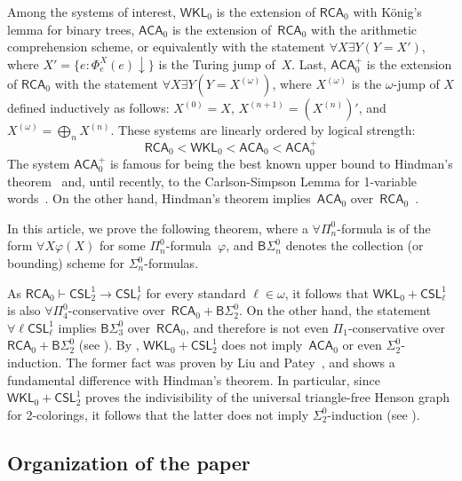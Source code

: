 \documentclass{article}
\numberwithin{theorem}{section}
\newtheorem{maintheorem}[theorem]{Main Theorem}
\newcommand{\RCA}{\mathsf{RCA}}
\newcommand{\WKL}{\mathsf{WKL}}
\newcommand{\ACA}{\mathsf{ACA}}
\newcommand{\CSL}{\mathsf{CSL}}
\newcommand{\BSig}{\mathsf{B}\Sigma^0}
\begin{document}
Among the systems of interest, $\WKL_0$ is the extension of $\RCA_0$ with K\"onig's lemma for binary trees, $\ACA_0$ is the extension of~$\RCA_0$ with the arithmetic comprehension scheme, or equivalently with the statement $\forall X \exists Y(Y = X')$, where $X' = \{ e : \Phi^X_e(e)\downarrow \}$ is the Turing jump of~$X$. Last, $\ACA_0^+$ is the extension of $\RCA_0$ with the statement $\forall X \exists Y(Y = X^{(\omega)})$, where $X^{(\omega)}$ is the $\omega$-jump of $X$ defined inductively as follows: $X^{(0)} = X$, $X^{(n+1)} = (X^{(n)})'$, and  $X^{(\omega)} = \bigoplus_n X^{(n)}$. These systems are linearly ordered by logical strength:
$$
\RCA_0 < \WKL_0 < \ACA_0 < \ACA_0^+
$$
The system $\ACA_0^+$ is famous for being the best known upper bound to Hindman's theorem~\cite{Towsner2012simple} and, until recently, to the Carlson-Simpson Lemma for 1-variable words~\cite{angles2023carlson}. On the other hand, Hindman's theorem implies~$\ACA_0$ over~$\RCA_0$~\cite{blass1987logical}.

In this article, we prove the following theorem, where a $\forall \Pi^0_n$-formula is of the form $\forall X \varphi(X)$ for some $\Pi^0_n$-formula~$\varphi$, and $\BSig_n$ denotes the collection (or bounding) scheme for $\Sigma^0_n$-formulas.


As $\RCA_0 \vdash \CSL^1_2 \to \CSL^1_\ell$ for every standard $\ell \in \omega$, it follows that $\WKL_0 + \CSL^1_\ell$ is also $\forall \Pi^0_4$-conservative over~$\RCA_0 + \BSig_2$. On the other hand, the statement $\forall \ell \CSL^1_\ell$ implies $\BSig_3$ over~$\RCA_0$, and therefore is not even $\Pi_1$-conservative over~$\RCA_0 + \BSig_2$ (see ).
By , $\WKL_0 + \CSL^1_2$ does not imply~$\ACA_0$ or even $\Sigma^0_2$-induction. The former fact was proven by Liu and Patey~\cite{liu2026reverse}, and shows a fundamental difference with Hindman's theorem. In particular, since $\WKL_0 + \CSL^1_2$ proves the indivisibility of the universal triangle-free Henson graph for 2-colorings, it follows that the latter does not imply $\Sigma^0_2$-induction (see ).

\subsection{Organization of the paper}
\end{document}
